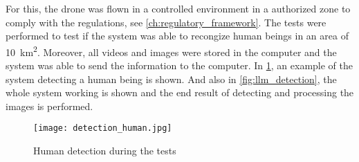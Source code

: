 For this, the drone was flown in a controlled environment in a authorized zone to comply with the regulations, see \cref{ch:regulatory_framework}. The tests were performed to test if the system was able to recongize human beings in an area of \SI{10}{\kilo\metre^2}. Moreover, all videos and images were stored in the computer and the system was able to send the information to the computer. In \cref{fig:detection_human}, an example of the system detecting a human being is shown. And also in \cref{fig:llm_detection}, the whole system working is shown and the end result of detecting and processing the images is performed.

\begin{figure}
	\texttt{[image: detection\_human.jpg]}
	\caption{Human detection during the tests}\label{fig:detection_human}
\end{figure}

